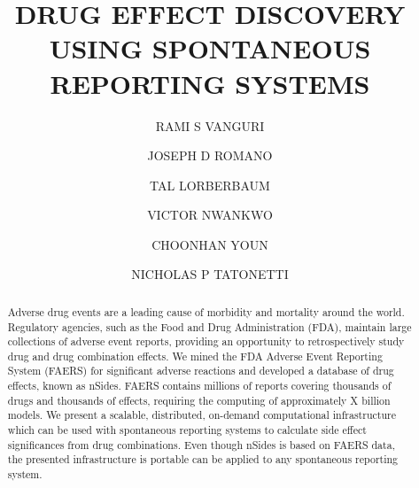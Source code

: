 \documentclass{ws-procs11x85}
\begin{document}
\title{DRUG EFFECT DISCOVERY USING SPONTANEOUS REPORTING SYSTEMS}

\author{RAMI S VANGURI}

\address{Department of Biomedical Informatics, Columbia University,\\
New York, NY 10032 USA\\
E-mail: r.vanguri@columbia.edu}

\author{JOSEPH D ROMANO}

\address{Department of Biomedical Informatics, Columbia University,\\
New York, NY 10032 USA\\
E-mail: jdr2160@columbia.edu}

\author{TAL LORBERBAUM}

\address{Department of Biomedical Informatics, Columbia University,\\
New York, NY 10032 USA\\
E-mail: tal.lorberbaum@columbia.edu}

\author{VICTOR NWANKWO}

\address{Department of Biomedical Informatics, Columbia University,\\
New York, NY 10032 USA\\
E-mail: vtn2106@columbia.edu}

\author{CHOONHAN YOUN}

\address{San Diego Supercomputer Center, University of California, San Diego,\\
La Jolla, CA 92093 USA\\
E-mail: cyoun@sdsc.edu}

\author{NICHOLAS P TATONETTI}

\address{Department of Biomedical Informatics, Columbia University,\\
New York, NY 10032 USA\\
E-mail: nick.tatonetti@columbia.edu}

\begin{abstract}
Adverse drug events are a leading cause of morbidity and mortality
around the world. Regulatory agencies, such as the Food and Drug
Administration (FDA), maintain large collections of adverse event
reports, providing an opportunity to retrospectively study drug and
drug combination effects.  We mined the FDA Adverse Event Reporting
System (FAERS) for significant adverse reactions and developed a
database of drug effects, known as nSides. FAERS contains millions of
reports covering thousands of drugs and thousands of effects,
requiring the computing of approximately X billion models. We present
a scalable, distributed, on-demand computational infrastructure which
can be used with spontaneous reporting systems to calculate side
effect significances from drug combinations. Even though nSides is
based on FAERS data, the presented infrastructure is portable can be
applied to any spontaneous reporting system.
\end{abstract}
\end{document}
